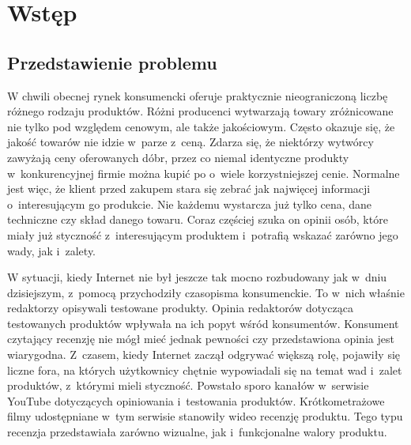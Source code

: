 \chapter{Wstęp}

\section{Przedstawienie problemu}
W chwili obecnej rynek konsumencki oferuje praktycznie nieograniczoną liczbę różnego rodzaju produktów. Różni producenci wytwarzają towary zróżnicowane nie tylko pod względem cenowym, ale także jakościowym. Często okazuje się, że jakość towarów nie idzie w~parze z~ceną. Zdarza się, że niektórzy wytwórcy  zawyżają ceny oferowanych dóbr, przez co niemal identyczne produkty w~konkurencyjnej firmie można kupić po o~wiele korzystniejszej cenie. Normalne jest więc, że klient przed zakupem stara się zebrać jak najwięcej informacji o~interesującym go produkcie. Nie każdemu wystarcza już tylko cena, dane techniczne czy skład danego towaru.  Coraz częściej szuka on opinii osób, które miały już styczność z~interesującym produktem i~potrafią wskazać zarówno jego wady, jak i~zalety. 

W sytuacji, kiedy Internet nie był jeszcze tak mocno rozbudowany jak w~dniu dzisiejszym, z~pomocą przychodziły czasopisma konsumenckie. To w~nich właśnie redaktorzy opisywali testowane produkty. Opinia redaktorów dotycząca testowanych produktów wpływała na ich popyt wśród konsumentów. Konsument czytający recenzję nie mógł mieć jednak pewności czy przedstawiona opinia jest wiarygodna. Z~czasem, kiedy Internet zaczął odgrywać większą rolę, pojawiły się liczne fora, na których użytkownicy chętnie wypowiadali się na temat wad i~zalet produktów, z~którymi mieli styczność. Powstało sporo kanałów w~serwisie YouTube dotyczących opiniowania i~testowania produktów. Krótkometrażowe filmy udostępniane w~tym serwisie stanowiły wideo recenzję produktu.  Tego typu recenzja przedstawiała zarówno wizualne, jak i~funkcjonalne walory produktu. 

